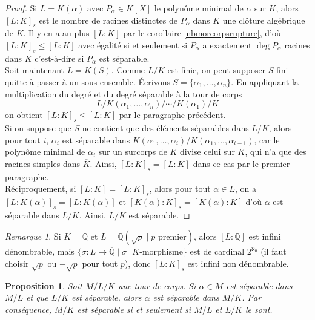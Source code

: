 \documentclass{article}
\newcommand{\Q}{\mathbb{Q}}
\newcommand{\Qbar}{\overline{\mathbb{Q}}}
\theoremstyle{plain}
\newtheorem{proposition}[theorem]{Proposition}
\theoremstyle{definition}
\theoremstyle{remark}
\newtheorem*{remark}{Remarque}
\begin{document}
\begin{proof}
    Si $L = K(\alpha)$ avec $P_\alpha \in K[X]$ le polynôme minimal de $\alpha$ sur $K$, alors $[L : K]_s$ est le nombre de racines distinctes de $P_\alpha$ dans $\overline{K}$ une clôture algébrique de $K$. Il y en a au plus $[L : K]$ par le corollaire \ref{nbmorcorpsrupture}, d'où $[L : K]_s \le [L : K]$ avec égalité si et seulement si $P_\alpha$ a exactement $\deg P_\alpha$ racines dans $\overline{K}$ c'est-à-dire si $P_\alpha$ est séparable.\\
    Soit maintenant $L = K(S)$. Comme $L/K$ est finie, on peut supposer $S$ fini quitte à passer à un sous-ensemble. Écrivons $S = \{\alpha_1,\dots,\alpha_n\}$. En appliquant la multiplication du degré et du degré séparable à la tour de corps
    \[L/K(\alpha_1,\dots,\alpha_n)/\cdots/K(\alpha_1)/K\]
    on obtient $[L : K]_s \le [L : K]$ par le paragraphe précédent. \\
    Si on suppose que $S$ ne contient que des éléments séparables dans $L/K$, alors pour tout $i$, $\alpha_i$ est séparable dans $K(\alpha_1,\dots,\alpha_i)/K(\alpha_1,\dots,\alpha_{i-1})$, car le polynôme minimal de $\alpha_i$ sur un surcorps de $K$ divise celui sur $K$, qui n'a que des racines simples dans $\overline{K}$. Ainsi, $[L : K]_s = [L : K]$ dans ce cas par le premier paragraphe. \\
    Réciproquement, si $[L : K] = [L : K]_s$, alors pour tout $\alpha \in L$, on a $[L : K(\alpha)]_s = [L : K(\alpha)]$ et $[K(\alpha) : K]_s = [K(\alpha) : K]$ d'où $\alpha$ est séparable dans $L/K$. Ainsi, $L/K$ est séparable.
\end{proof}

\begin{remark}
    Si $K = \Q$ et $L = \Q(\sqrt{p} \mid p \text{ premier})$, alors $[L : \Q]$ est infini dénombrable, mais $\{\sigma : L \to \Qbar \mid \sigma\text{ $K$-morphisme}\}$ est de cardinal $2^{\aleph_0}$ (il faut choisir $\sqrt{p}$ ou $-\sqrt{p}$ pour tout $p$), donc $[L : K]_s$ est infini non dénombrable.
\end{remark}

\begin{proposition}
    Soit $M/L/K$ une tour de corps. Si $\alpha \in M$ est séparable dans $M/L$ et que $L/K$ est séparable, alors $\alpha$ est séparable dans $M/K$. Par conséquence, $M/K$ est séparable si et seulement si $M/L$ et $L/K$ le sont.
\end{proposition}
\end{document}
